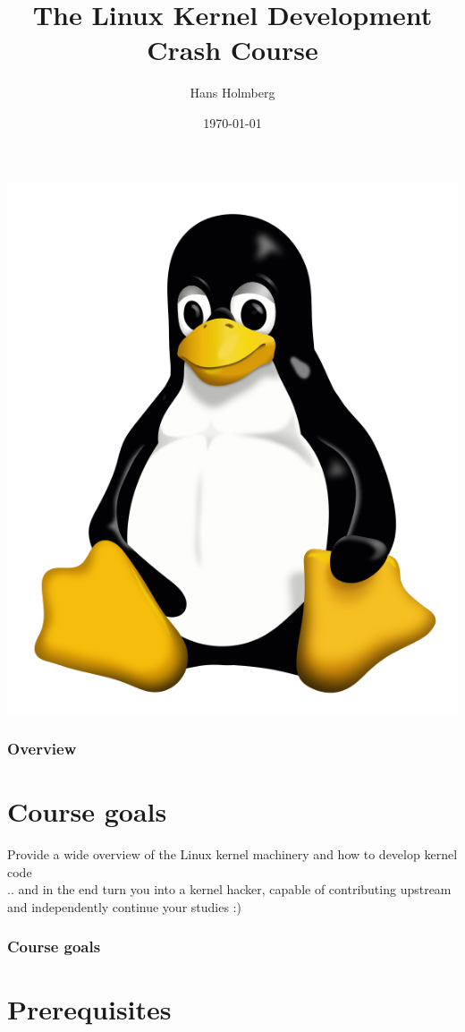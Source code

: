 \documentclass{beamer}
\title[TLKDCC Intro]{The Linux Kernel Development Crash Course}
\author{Hans Holmberg}
\institute[LKTP]
{
Linux Kernel Teaching Project \\ 
\medskip
\textit{hans.holmberg@gmail.com}
}
\date{\today}
\begin{document}
\begin{frame}
\titlepage
\includegraphics{tux}
\end{frame}

\begin{frame}
\frametitle{Overview}
\tableofcontents 
\end{frame}

\section{Course goals} 

\begin{frame}
Provide a wide overview of the Linux kernel machinery and how to develop kernel code \\
.. and in the end turn you into a kernel hacker, capable of contributing upstream and independently continue your studies :)
\frametitle{Course goals}
\end{frame}

\section{Prerequisites}
\end{document}
